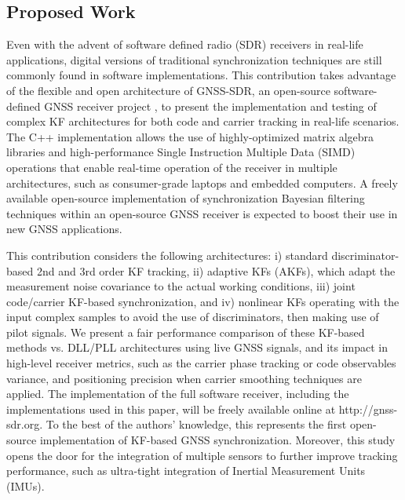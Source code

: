 \subsection{Proposed Work}

Even with the advent of software defined radio (SDR) receivers in real-life applications, digital versions of traditional synchronization techniques are still commonly found in software implementations. This contribution takes advantage of the flexible and open architecture of GNSS-SDR, an open-source software-defined GNSS receiver project \cite{GNSS-SDR11}, to present the implementation and testing of complex KF architectures for both code and carrier tracking in real-life scenarios. The C++ implementation allows the use of highly-optimized matrix algebra libraries and high-performance Single Instruction Multiple Data (SIMD) operations that enable real-time operation of the receiver in multiple architectures, such as consumer-grade laptops and embedded computers. A freely available open-source implementation of synchronization Bayesian filtering techniques within an open-source GNSS receiver is expected to boost their use in new GNSS applications.

This contribution considers the following architectures: i) standard discriminator-based 2nd and 3rd order KF tracking, ii) adaptive KFs (AKFs), which adapt the measurement noise covariance to the actual working conditions, iii) joint code/carrier KF-based synchronization, and iv) nonlinear KFs operating with the input complex samples to avoid the use of discriminators, then making use of pilot signals. We present a fair performance comparison of these KF-based methods vs. DLL/PLL architectures using live GNSS signals, and its impact in high-level receiver metrics, such as the carrier phase tracking or code observables variance, and positioning precision when carrier smoothing techniques are applied. The implementation of the full software receiver, including the implementations used in this paper, will be freely available online at http://gnss-sdr.org. To the best of the authors' knowledge, this represents the first open-source implementation of KF-based GNSS synchronization. Moreover, this study opens the door for the integration of multiple sensors to further improve tracking performance, such as ultra-tight integration of Inertial Measurement Units (IMUs).




